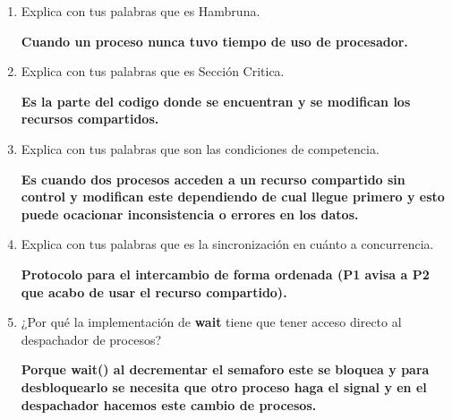 \documentclass[12pt]{article}
\begin{document}
\begin{enumerate}
    \item Explica con tus palabras que es Hambruna.
    \vspace{2mm}
    
    \textbf{Cuando un proceso nunca tuvo tiempo de uso de procesador.}

    \item Explica con tus palabras que es Sección Critica.
    \vspace{2mm}
    
    \textbf{Es la parte del codigo donde se encuentran y se modifican los recursos compartidos.}

    \item Explica con tus palabras que son las condiciones de competencia.
    \vspace{2mm}
    
    \textbf{Es cuando dos procesos acceden a un recurso compartido sin control y modifican este dependiendo de cual llegue primero y esto puede ocacionar inconsistencia o errores en los datos.}

    \item Explica con tus palabras que es la sincronización en cuánto a concurrencia.
    \vspace{2mm}
    
    \textbf{Protocolo para el intercambio de forma ordenada (P1 avisa a P2 que acabo de usar el recurso compartido).}

    \item ¿Por qué la implementación de \textbf{wait} tiene que tener acceso directo al despachador de procesos?
    \vspace{2mm}

    \textbf{Porque wait() al decrementar el semaforo este se bloquea y para desbloquearlo se necesita que otro proceso haga el signal y en el despachador hacemos este cambio de procesos.}

\end{enumerate}
\end{document}
